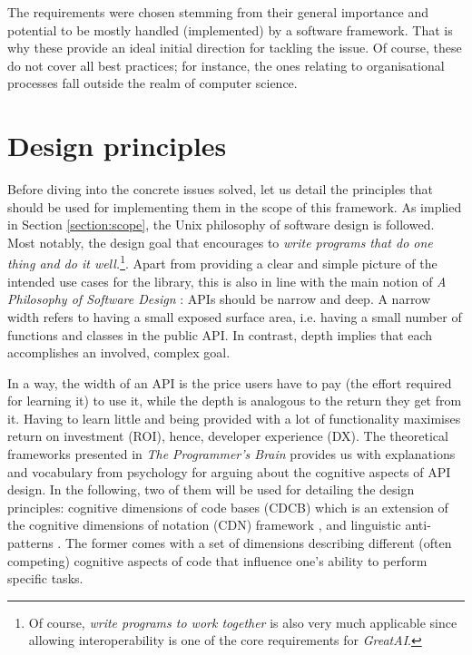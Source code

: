 The requirements were chosen stemming from their general importance and potential to be mostly handled (implemented) by a software framework. That is why these provide an ideal initial direction for tackling the issue. Of course, these do not cover all best practices; for instance, the ones relating to organisational processes fall outside the realm of computer science.

\section{Design principles} \label{section:principles}

Before diving into the concrete issues solved, let us detail the principles that should be used for implementing them in the scope of this framework. As implied in Section \ref{section:scope}, the Unix philosophy \cite{ritchie1978unix,salus1994quarter} of software design is followed. Most notably, the design goal that encourages to \textit{write programs that do one thing and do it well.}\footnote{Of course, \textit{write programs to work together} is also very much applicable since allowing interoperability is one of the core requirements for \textit{GreatAI}.}. Apart from providing a clear and simple picture of the intended use cases for the library, this is also in line with the main notion of \textit{A Philosophy of Software Design} \cite{ousterhout2018philosophy}: APIs should be narrow and deep. A narrow width refers to having a small exposed surface area, i.e. having a small number of functions and classes in the public API. In contrast, depth implies that each accomplishes an involved, complex goal. 

In a way, the width of an API is the price users have to pay (the effort required for learning it) to use it, while the depth is analogous to the return they get from it. Having to learn little and being provided with a lot of functionality maximises return on investment (ROI), hence, developer experience (DX). The theoretical frameworks presented in \textit{The Programmer's Brain} \cite{hermans2021programmer} provides us with explanations and vocabulary from psychology for arguing about the cognitive aspects of API design. In the following, two of them will be used for detailing the design principles: cognitive dimensions of code bases (CDCB) which is an extension of the cognitive dimensions of notation (CDN) framework \cite{blackwell2001cognitive}, and linguistic anti-patterns \cite{arnaoudova2016linguistic}. The former comes with a set of dimensions describing different (often competing) cognitive aspects of code that influence one's ability to perform specific tasks.

